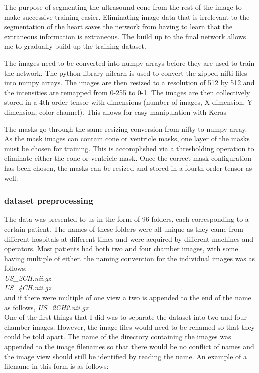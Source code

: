 \documentclass[12pt]{article}
\begin{document}
\par %
The purpose of segmenting the ultrasound cone from the rest of the image to make successive training easier.
Eliminating image data that is irrelevant to the segmentation of the heart saves the network from having to learn that the extraneous information is extraneous. The build up to the final network allows me to gradually build up the training dataset.
\par
The images need to be converted into numpy arrays before they are used to train the network. The python library nilearn is used to convert the zipped nifti files into numpy arrays. The images are then resized to a resolution of 512 by 512 and the intensities are remapped from 0-255 to 0-1. The images are then collectively stored in a 4th order tensor with dimensions (number of images, X dimension, Y dimension, color channel). This allows for easy manipulation with Keras
\par
The masks go through the same resizing conversion from nifty to numpy array. As the mask images can contain cone or ventricle masks, one layer of the masks must be chosen for training. This is accomplished via a thresholding operation to eliminate either the cone or ventricle mask. Once the correct mask configuration has been chosen, the masks can be resized and stored in a fourth order tensor as well.

\subsubsection{dataset preprocessing}
The data was presented to us in the form of 96 folders, each corresponding to a certain patient.
The names of these folders were all unique as they came from different hospitals at different times and were acquired by different machines and operators.
Most patients had both two and four chamber images, with some having multiple of either. 
the naming convention for the individual images was as follows:\\

\textit{US\_2CH.nii.gz}\\
\textit{US\_4CH.nii.gz}\\
and if there were multiple of one view a two is appended to the end of the name as follows,
\textit{US\_2CH2.nii.gz}\\

One of the first things that I did was to separate the dataset into two and four chamber images. However, the image files would need to be renamed so that they could be told apart.
The name of the directory containing the images was appended to the image filenames so that there would be no conflict of names and the image view should still be identified by reading the name.
An example of a filename in this form is as follows:\\
\end{document}

